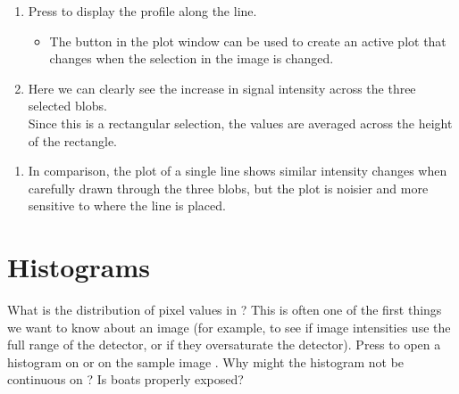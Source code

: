 \documentclass[letterpaper,10pt,english]{jupyterBook}
\begin{document}
\sphinxAtStartPar
{}
\begin{enumerate}
%
\setcounter{enumi}{2}
\item {} 
\sphinxAtStartPar
Press  to display the profile along the line.
\begin{itemize}
\item {} 
\sphinxAtStartPar
The  button in the plot window can be used to create an active plot that
changes when the selection in the image is changed.

\end{itemize}

\item {} 
\sphinxAtStartPar
Here we can clearly see the increase in signal intensity across the three selected
blobs.\\
Since this is a rectangular selection, the values are averaged across the height of the rectangle.

\end{enumerate}

\sphinxAtStartPar
{}
\begin{enumerate}
%
\setcounter{enumi}{4}
\item {} 
\sphinxAtStartPar
In comparison, the plot of a single line shows similar intensity changes when
carefully drawn through the three blobs, but the plot is noisier and more sensitive
to where the line is placed.

\end{enumerate}

\sphinxAtStartPar
{}


\section{Histograms}
\label{\detokenize{basics:histograms}}
\sphinxAtStartPar
What is the distribution of pixel values in ? This is often one of the first things we want to know about an image (for example, to see if image intensities use the full range of the detector, or if they oversaturate the detector). Press  to open a histogram on  or on the sample image . Why might the histogram not be continuous on ? Is boats properly exposed?
\end{document}
